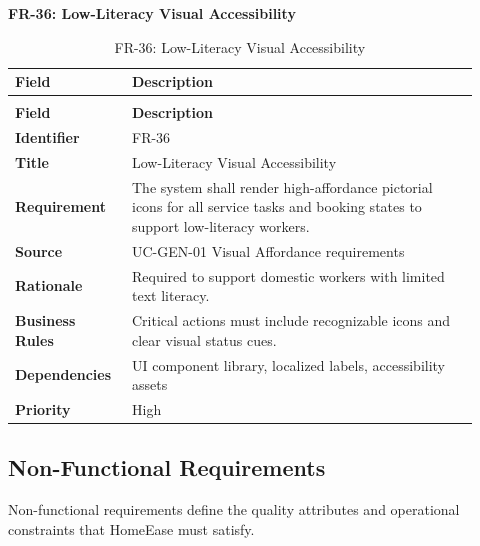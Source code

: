 \documentclass[12pt,a4paper]{article}
\begin{document}
\noindent\textbf{FR-36: Low-Literacy Visual Accessibility}\par
\vspace{4pt}
\begingroup\small\setlength{\tabcolsep}{4pt}\renewcommand{\arraystretch}{1.15}
\begin{longtable}{|>{\raggedright\arraybackslash}p{0.22\linewidth}|>{\raggedright\arraybackslash}p{0.70\linewidth}|}
\caption{FR-36: Low-Literacy Visual Accessibility}\label{tab:fr-36}\\
\hline
\textbf{Field} & \textbf{Description} \\ \hline
\endfirsthead
\multicolumn{2}{c}{Table \thetable\ Low-Literacy Visual Accessibility (continued)}\\
\hline
\textbf{Field} & \textbf{Description} \\ \hline
\endhead
\textbf{Identifier} & FR-36 \\ \hline
\textbf{Title} & Low-Literacy Visual Accessibility \\ \hline
\textbf{Requirement} & The system shall render high-affordance pictorial icons for all service tasks and booking states to support low-literacy workers. \\ \hline
\textbf{Source} & UC-GEN-01 Visual Affordance requirements \\ \hline
\textbf{Rationale} & Required to support domestic workers with limited text literacy. \\ \hline
\textbf{Business Rules} & Critical actions must include recognizable icons and clear visual status cues. \\ \hline
\textbf{Dependencies} & UI component library, localized labels, accessibility assets \\ \hline
\textbf{Priority} & High \\ \hline
\end{longtable}
\endgroup
\clearpage
\subsection{Non-Functional Requirements}
Non-functional requirements define the quality attributes and operational constraints that HomeEase must satisfy.
\end{document}
